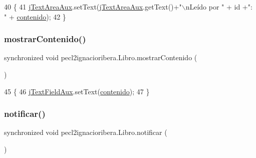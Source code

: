 \begin{DoxyCode}
40     \{
41         \mbox{\hyperlink{classpecl2ignacioribera_1_1_libro_aa3e89b7cad094609fe96bb5ec370c5a6}{jTextAreaAux}}.setText(\mbox{\hyperlink{classpecl2ignacioribera_1_1_libro_aa3e89b7cad094609fe96bb5ec370c5a6}{jTextAreaAux}}.getText()+\textcolor{stringliteral}{"\(\backslash\)nLeído por "} + \textcolor{keywordtype}{id} +\textcolor{stringliteral}{": "} + 
      \mbox{\hyperlink{classpecl2ignacioribera_1_1_libro_acb52ac741427b64544c1f65b6bbb898a}{contenido}});
42     \}
\end{DoxyCode}
\mbox{\label{classpecl2ignacioribera_1_1_libro_abe0c6068a2acc893bca1caff4c6bf424}} 
\subsubsection{\texorpdfstring{mostrar\+Contenido()}{mostrarContenido()}}
{\footnotesize\ttfamily synchronized void pecl2ignacioribera.\+Libro.\+mostrar\+Contenido (\begin{DoxyParamCaption}{ }\end{DoxyParamCaption})\hspace{0.3cm}{\ttfamily [inline]}}


\begin{DoxyCode}
45     \{
46         \mbox{\hyperlink{classpecl2ignacioribera_1_1_libro_a087e60795a9f9b8c9f393bfcb9a4d70b}{jTextFieldAux}}.setText(\mbox{\hyperlink{classpecl2ignacioribera_1_1_libro_acb52ac741427b64544c1f65b6bbb898a}{contenido}});
47     \}
\end{DoxyCode}
\mbox{\label{classpecl2ignacioribera_1_1_libro_a44cfbf7f47ada045300c48a3712aa804}} 
\subsubsection{\texorpdfstring{notificar()}{notificar()}}
{\footnotesize\ttfamily synchronized void pecl2ignacioribera.\+Libro.\+notificar (\begin{DoxyParamCaption}{ }\end{DoxyParamCaption})\hspace{0.3cm}{\ttfamily [inline]}}


